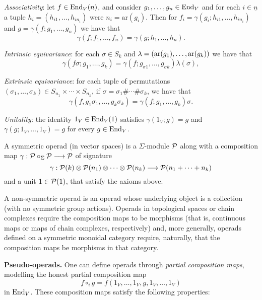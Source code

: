 \begin{tenumerate}
\item \emph{Associativity}: let $f\in \operatorname{End}_V(n)$,
and consider $g_1,\ldots,g_n \in \operatorname{End}_V$ and
for each $i\in \underline{n}$ a tuple $h_i= (h_{i1},\ldots,h_{i n_i})$
were $n_i= \mathrm{ar}(g_i)$. Then for
$f_i = \gamma(g_i; h_{i1},\ldots,h_{in_i})$ 
and $g= \gamma(f; g_1,\ldots,g_n)$ we have
that
\[ \gamma(f;f_1,\ldots,f_n) = 
	\gamma(g; h_1,\ldots,h_n).\]
\item \emph{Intrinsic equivariance}: for
each $\sigma\in S_k$ and $\lambda = (\operatorname{ar}(g_1),\ldots,\operatorname{ar}(g_k))$ we have that
\[ \gamma(f\sigma; g_1,\ldots,g_k) = 	
	\gamma(f; g_{\sigma 1} ,\ldots, 
		g_{\sigma k})\lambda(\sigma),\]
	
\item \emph{Extrinsic equivariance}: for each
tuple of permutations $(\sigma_1,\ldots,\sigma_k) \in S_{n_1} \times
\cdots \times S_{n_k}$, if $\sigma = \sigma_1\#\cdots\#\sigma_k$, we have that
\[\gamma(f,g_1\sigma_1,\ldots,g_k\sigma_k) = 
	\gamma(f; g_1,\ldots,g_k)\sigma.\]
\item \emph{Unitality:} the identity $1_V\in\operatorname{End}_V(1)$
satisfies $\gamma(1_V;g) = g$ and $\gamma(g;1_V,\ldots,1_V) = g$ for every $g\in\operatorname{End}_V$.
\end{tenumerate}

\begin{definition} 
A symmetric operad (in vector spaces) is a
$\Sigma$-module ${\mathcal{P}}$ along with a composition
map $\gamma : {\mathcal{P}}\circ_\Sigma {\mathcal{P}} \longrightarrow {\mathcal{P}}$
of signature
\[\gamma : {\mathcal{P}}(k)\otimes 
	{\mathcal{P}}(n_1) \otimes \cdots \otimes {\mathcal{P}}(n_k)
	 	\longrightarrow {\mathcal{P}}(n_1+\cdots+n_k)\]
and a unit $1\in {\mathcal{P}}(1)$, that satisfy
the axioms above. 
\end{definition} 

\begin{variante} A non-symmetric operad is
an operad whose underlying object is a collection
(with no symmetric group actions). Operads in
topological spaces or chain complexes require
the composition maps to be morphisms (that is,
continuous maps or maps of chain complexes,
respectively) and, more generally, operads 
defined on a symmetric monoidal category
require, naturally, that the composition
maps be morphisms in that category. 
\end{variante}

\textbf{Pseudo-operads.}
One can define operads through \emph{partial 
composition maps}, modelling the honest partial
composition map
\[ f\circ_i g = f(1_V,\ldots,1_V,g,1_V,\ldots,1_V)\] 
in $\operatorname{End}_V$. These composition maps satisfy the
following properties:

